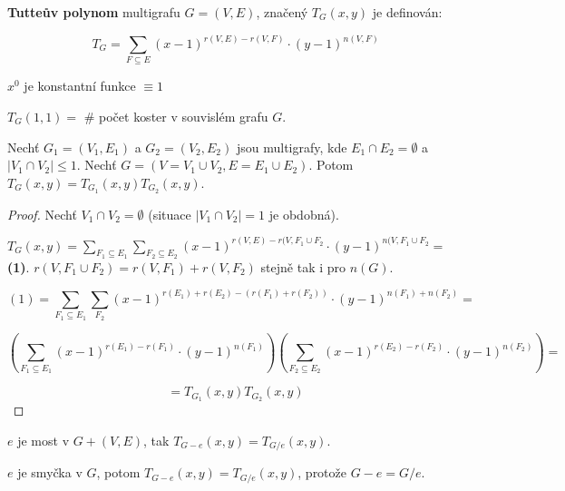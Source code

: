 \begin{definice}
	\textbf{Tutteův polynom} multigrafu $G=(V,E)$, značený $T_{G}(x,y)$ je definován:
	
	$$
	T_{G} = \sum_{F \subseteq E} (x-1)^{r(V,E)-r(V,F)} \cdot (y-1)^{n(V,F)}
	$$
\end{definice}

\begin{pozn}
	$x^{0}$ je konstantní funkce $\equiv 1$
\end{pozn}

\begin{pozor}
	$T_{G}(1,1) =$ \# počet koster v souvislém grafu $G$.
\end{pozor}

\begin{tvrz}
	Nechť $G_{1} =(V_{1},E_{1})$ a $G_{2} = (V_{2},E_{2})$ jsou multigrafy, kde $E_{1} \cap E_{2} = \emptyset$ a $|V_{1} \cap V_{2}| \leq 1$. Nechť $G = (V = V_{1} \cup V_{2}, E = E_{1} \cup E_{2})$. Potom $T_{G}(x,y) = T_{G_{1}}(x,y)T_{G_{2}}(x,y)$.
\end{tvrz}

\begin{proof}
	Nechť $V_{1} \cap V_{2} = \emptyset$ (situace $|V_{1} \cap V_{2}| = 1$ je obdobná).
	
	$T_{G}(x,y) = \sum_{F_{1} \subseteq E_{1}} \sum_{F_{2} \subseteq E_{2}} (x-1)^{r(V,E) - r(V, F_{1} \cup F_{2}} \cdot (y-1)^{n(V,F_{1} \cup F_{2}} =$ \textbf{(1)}. $r(V, F_{1} \cup F_{2}) = r(V,F_{1}) + r(V,F_{2})$ stejně tak i pro $n(G)$.
	
	$$
	(1) = \sum_{F_{1} \subseteq E_{1}} \sum_{F_{2}} (x-1)^{r(E_{1})+r(E_{2}) - (r(F_{1}) + r(F_{2}))} \cdot (y-1)^{n(F_{1}) + n(F_{2})} =
	$$
	
	$$
	\left( \sum_{F_{1}\subseteq E_{1}} (x-1)^{r(E_{1}) - r(F_{1})} \cdot (y-1)^{n(F_{1})}\right) \left( \sum_{F_{2}\subseteq E_{2}} (x-1)^{r(E_{2}) - r(F_{2})} \cdot (y-1)^{n(F_{2})} \right) =
	$$
	
	$$
	=T_{G_{1}}(x,y) T_{G_{2}}(x,y)
	$$
\end{proof}

\begin{dusl}
	$e$ je most v $G+(V,E)$, tak $T_{G-e}(x,y) = T_{G/e}(x,y)$.
\end{dusl}

\begin{pozor}
	$e$ je smyčka v $G$, potom $T_{G-e}(x,y) = T_{G/e}(x,y)$, protože $G-e = G/e$.
\end{pozor}

